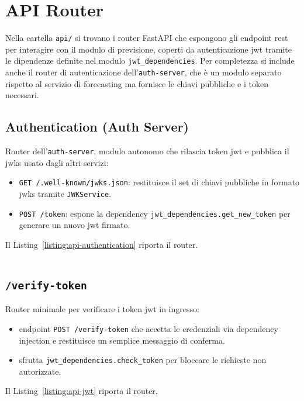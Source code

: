 \section{API Router}
Nella cartella \texttt{api/} si trovano i router FastAPI che espongono gli endpoint \acrshort{rest} per interagire con il modulo di previsione, coperti da autenticazione \acrshort{jwt} tramite le dipendenze definite nel modulo \texttt{jwt\_dependencies}. Per completezza si include anche il router di autenticazione dell’\texttt{auth-server}, che è un modulo separato rispetto al servizio di forecasting ma fornisce le chiavi pubbliche e i token necessari.

\subsection{Authentication (Auth Server)}
\label{sec:code-api-authentication}
Router dell’\texttt{auth-server}, modulo autonomo che rilascia token \acrshort{jwt} e pubblica il \acrshort{jwks} usato dagli altri servizi:
\begin{itemize}
    \item \texttt{GET /.well-known/jwks.json}: restituisce il set di chiavi pubbliche in formato \acrshort{jwks} tramite \texttt{JWKService}.
    \item \texttt{POST /token}: espone la dependency \texttt{jwt\_dependencies.get\_new\_token} per generare un nuovo \acrshort{jwt} firmato.
\end{itemize}
Il Listing~\ref{listing:api-authentication} riporta il router.
\captionsetup{type=listing, belowskip=0pt}
\inputminted[fontsize=\small, breaklines, breakanywhere=true, linenos=true, bgcolor=gray!10]{python}{code/api/authentication.py}
\label{listing:api-authentication}

\subsection{\texttt{/verify-token}}
\label{sec:code-api-jwt}
Router minimale per verificare i token \acrshort{jwt} in ingresso:
\begin{itemize}
    \item endpoint \texttt{POST /verify-token} che accetta le credenziali via dependency injection e restituisce un semplice messaggio di conferma.
    \item sfrutta \texttt{jwt\_dependencies.check\_token} per bloccare le richieste non autorizzate.
\end{itemize}
Il Listing~\ref{listing:api-jwt} riporta il router.
\captionsetup{type=listing, belowskip=0pt}
\inputminted[fontsize=\small, breaklines, breakanywhere=true, linenos=true, bgcolor=gray!10]{python}{code/api/jwt.py}
\label{listing:api-jwt}

